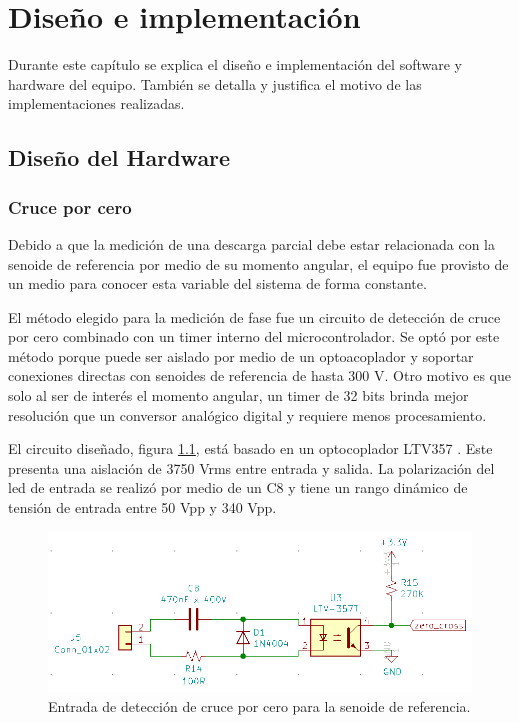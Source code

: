 \chapter{Diseño e implementación} %

\label{Chapter3} %
Durante este capítulo se explica el diseño e implementación del software y hardware del equipo. También se detalla y justifica el motivo de las implementaciones realizadas.

\section{Diseño del Hardware}
\subsection{Cruce por cero}

Debido a que la medición de una descarga parcial debe estar relacionada con la senoide de referencia por medio de su momento angular, el equipo fue provisto de un medio para conocer esta variable del sistema de forma constante.

El método elegido para la medición de fase fue un circuito de detección de cruce por cero combinado con un timer interno del microcontrolador. Se optó por este método porque puede ser aislado por medio de un optoacoplador y soportar conexiones directas con senoides de referencia de hasta 300 V. Otro motivo es que solo al ser de interés el momento angular, un timer de 32 bits brinda mejor resolución que un conversor analógico digital y requiere menos procesamiento.

El circuito diseñado, figura \ref{fig:schZeroCross}, está basado en un optocoplador LTV357 \citep{opto:ltv357}. Este presenta una aislación de 3750 Vrms entre entrada y salida. La polarización del led de entrada se realizó por medio de un C8 y tiene un rango dinámico de tensión de entrada entre 50 Vpp y 340 Vpp. 

\begin{figure}[ht]
	\centering
	\includegraphics[width=130mm]{./Figures/schZeroCross.png}
	\caption{Entrada de detección de cruce por cero para la senoide de referencia.}
	\label{fig:schZeroCross}
\end{figure}

